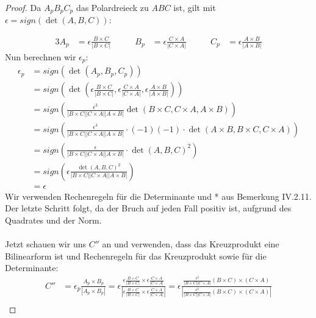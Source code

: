 \documentclass[12pt,a4paper]{article}
\begin{document}
\begin{proof}
Da $A_pB_pC_p$ das Polardreieck zu $ABC$ ist, gilt mit $\epsilon = sign(\det(A,B,C))$:

 \begin{alignat*}{3}     
 A_p &= \epsilon \frac{B \times C}{|B \times C|} \qquad 
     &B_p &= \epsilon \frac{C \times A}{|C \times A|} \qquad     
     &C_p &= \epsilon \frac{A \times B}{|A \times B|} \end{alignat*}
Nun berechnen wir $\epsilon_p$: \\
\begin{align*}
    \epsilon_p &= sign(\det(A_p, B_p, C_p)) \\
               &= sign \left(\det \left(\epsilon \frac{B \times C}{|B \times C|}, \epsilon \frac{C \times A}{|C \times A|}, \epsilon \frac{A \times B}{|A \times B|} \right)\right) \\
               &= sign \left(\frac{\epsilon^{3}}{|B \times C||C \times A||A \times B|} \det (B \times C, C \times A, A \times B)\right) \\
               &= sign \left(\frac{\epsilon^{3}}{|B \times C||C \times A||A \times B|} \cdot (-1)(-1) \cdot \det (A \times B, B \times C, C \times A)\right) \\
               &= sign \left( \frac{\epsilon}{|B \times C||C \times A||A \times B|} \cdot \det(A, B, C)^2 \right) \\
               &= sign \left( \epsilon \frac{\det(A, B, C)^2}{|B \times C||C \times A||A \times B|} \right) \\
               &= \epsilon
\end{align*}
Wir verwenden Rechenregeln für die Determinante und * aus Bemerkung IV.2.11. Der letzte Schritt folgt, da der Bruch auf jeden Fall positiv ist, aufgrund des Quadrates und der Norm. \\
\\
Jetzt schauen wir uns $C''$ an und verwenden, dass das Kreuzprodukt eine Bilinearform ist und Rechenregeln für das Kreuzprodukt sowie für die Determinante:
\begin{align*}
C'' &= \epsilon_p \frac{A_p \times B_p}{|A_p \times B_p|} = \epsilon \frac{\epsilon \frac{B \times C}{|B \times C|} \times \epsilon \frac{C \times A}{|C \times A|} }{|\epsilon \frac{B \times C}{|B \times C|}  \times \epsilon \frac{C \times A}{|C \times A|}|} = \epsilon \frac{\frac{\epsilon^2}{|B \times C||C \times A|} (B \times C) \times (C\times A)}{\left|\frac{\epsilon^2}{|B \times C||C \times A|} (B \times C) \times (C\times A) \right|} \\

\end{align*}
\end{proof}
\end{document}

